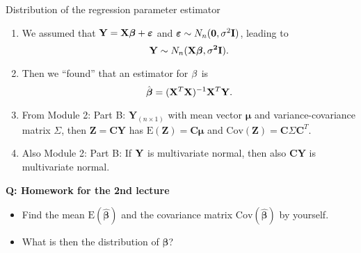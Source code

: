 \documentclass[ignorenonframetext,]{beamer}
\providecommand{\tightlist}{%
  \setlength{\itemsep}{0pt}\setlength{\parskip}{0pt}}
\begin{document}
\begin{frame}

\begin{block}{Distribution of the regression parameter estimator}

\begin{enumerate}
\def\labelenumi{\arabic{enumi}.}
\tightlist
\item
  We assumed that
  \({\bf Y=X \boldsymbol\beta}+{\boldsymbol \varepsilon}\) and
  \(\boldsymbol\varepsilon\sim N_n({\bf 0},\sigma^2 {\bf I})\), leading
  to \[ {\bf Y} \sim N_{n}(\bf X \boldsymbol \beta,\sigma^2 {\bf I}).\]
\item
  Then we ``found'' that an estimator for \({\bf \beta}\) is
  \[ \hat{\boldsymbol\beta}=({\bf X}^T{\bf X})^{-1} {\bf X}^T {\bf Y}.\]
\item
  From Module 2: Part B: \(\mathbf{Y}_{(n\times 1)}\) with mean vector
  \(\mathbf{\mu}\) and variance-covariance matrix \(\Sigma\), then
  \(\mathbf{Z}=\mathbf{C}\mathbf{Y}\) has
  \(\text{E}(\mathbf{Z})=\mathbf{C}\mathbf{\mu}\) and
  \(\text{Cov}(\mathbf{Z})=  \mathbf{C}\Sigma\mathbf{C}^T\).
\item
  Also Module 2: Part B: If \({\bf Y}\) is multivariate normal, then
  also \(\mathbf{C}\mathbf{Y}\) is multivariate normal.
\end{enumerate}

\textbf{Q: Homework for the 2nd lecture}

\begin{itemize}
\tightlist
\item
  Find the mean \(\text{E}(\hat{\boldsymbol\beta})\) and the covariance
  matrix \(\text{Cov}(\hat{\boldsymbol\beta})\) by yourself.
\item
  What is then the distribution of \(\hat{\boldsymbol\beta}\)?
\end{itemize}

\end{block}

\end{frame}
\end{document}
